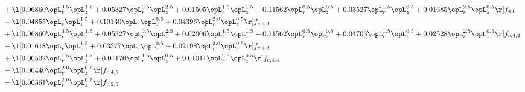 \begin{alignat}{2}
& + \l[  0.06860 \opL_r^{0.5} \opL_z^{1.5} +  0.05327 \opL_r^{0.5} \opL_z^{2.5} +  0.01505 \opL_r^{1.5} \opL_z^{1.5} +  0.11562 \opL_r^{0.5} \opL_z^{0.5} +  0.03527 \opL_r^{1.5} \opL_z^{0.5} +  0.01685 \opL_r^{2.5} \opL_z^{0.5}  \r] f_{4,0} \nonumber \\ 
& - \l[  0.04855 \opL_r \opL_z^{1.5} +  0.10130 \opL_r \opL_z^{0.5} +  0.04396 \opL_r^{2.0} \opL_z^{0.5}  \r] f_{c,4,1} \nonumber \\ 
& + \l[  0.06860 \opL_r^{0.5} \opL_z^{1.5} +  0.05327 \opL_r^{0.5} \opL_z^{2.5} +  0.02006 \opL_r^{1.5} \opL_z^{1.5} +  0.11562 \opL_r^{0.5} \opL_z^{0.5} +  0.04703 \opL_r^{1.5} \opL_z^{0.5} +  0.02528 \opL_r^{2.5} \opL_z^{0.5}  \r] f_{c,4,2} \nonumber \\ 
& - \l[  0.01618 \opL_r \opL_z^{1.5} +  0.03377 \opL_r \opL_z^{0.5} +  0.02198 \opL_r^{2.0} \opL_z^{0.5}  \r] f_{c,4,3} \nonumber \\ 
& + \l[  0.00502 \opL_r^{1.5} \opL_z^{1.5} +  0.01176 \opL_r^{1.5} \opL_z^{0.5} +  0.01011 \opL_r^{2.5} \opL_z^{0.5}  \r] f_{c,4,4} \nonumber \\ 
& - \l[  0.00440 \opL_r^{2.0} \opL_z^{0.5}  \r] f_{c,4,5} \nonumber \\ 
& - \l[  0.00361 \opL_r^{2.0} \opL_z^{0.5}  \r] f_{c,2,5} \nonumber \\ 
\end{alignat} 


